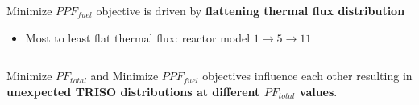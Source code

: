 \begin{frame}
\begin{columns}
\begin{column}{0.6\linewidth}
\begin{itemize}
            \end{itemize}
            Minimize $PPF_{fuel}$ objective is driven by \textbf{flattening thermal 
            flux distribution} 
            \begin{itemize}
                \item Most to least flat thermal flux: reactor model 
                $1 \rightarrow 5 \rightarrow 11$
            \end{itemize}
        \end{column}
    \end{columns}
    \begin{tcolorbox}[colback=illiniorange,colframe=illiniorange!50!black]
        Minimize $PF_{total}$ and Minimize $PPF_{fuel}$ objectives 
        influence each other resulting in \textbf{unexpected TRISO distributions at 
        different $PF_{total}$ values}. 
    \end{tcolorbox}
\end{frame}

